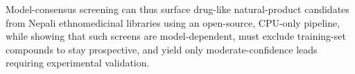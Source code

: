 {\vspace{0.18cm}
\noindent
Model-consensus screening can thus surface drug-like natural-product candidates from
Nepali ethnomedicinal libraries using an open-source, CPU-only pipeline, while showing
that such screens are model-dependent, must exclude training-set compounds to stay
prospective, and yield only moderate-confidence leads requiring experimental validation.

\vspace{0.3cm}
\par}